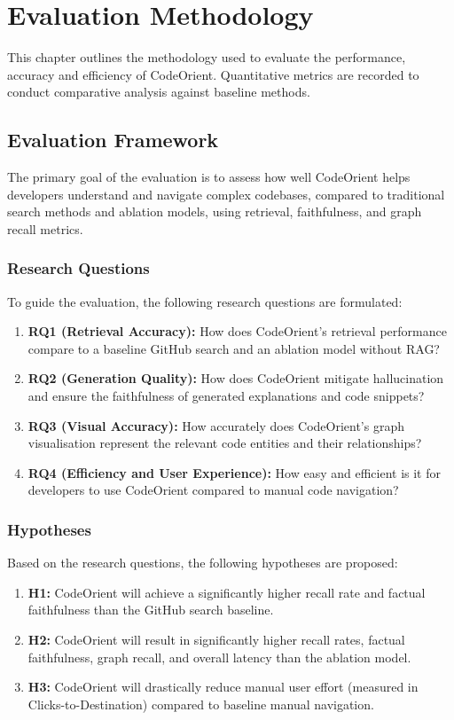 \chapter{Evaluation Methodology}
This chapter outlines the methodology used to evaluate the performance, accuracy and efficiency of CodeOrient. Quantitative metrics are recorded to conduct comparative analysis against baseline methods. 
\section{Evaluation Framework}
The primary goal of the evaluation is to assess how well CodeOrient helps developers understand and navigate complex codebases, compared to traditional search methods and ablation models, using retrieval, faithfulness, and graph recall metrics.
\subsection{Research Questions}
To guide the evaluation, the following research questions are formulated:
\begin{enumerate}
    \item \textbf{RQ1 (Retrieval Accuracy):} How does CodeOrient's retrieval performance compare to a baseline GitHub search and an ablation model without RAG?
    \item \textbf{RQ2 (Generation Quality):} How does CodeOrient mitigate hallucination and ensure the faithfulness of generated explanations and code snippets?
    \item \textbf{RQ3 (Visual Accuracy):} How accurately does CodeOrient's graph visualisation represent the relevant code entities and their relationships?
    \item \textbf{RQ4 (Efficiency and User Experience):} How easy and efficient is it for developers to use CodeOrient compared to manual code navigation?
\end{enumerate}

\subsection{Hypotheses}
Based on the research questions, the following hypotheses are proposed:
\begin{enumerate}
    \item \textbf{H1:} CodeOrient will achieve a significantly higher recall rate and factual faithfulness than the GitHub search baseline.
    \item \textbf{H2:} CodeOrient will result in significantly higher recall rates, factual faithfulness, graph recall, and overall latency than the ablation model.
    \item \textbf{H3:} CodeOrient will drastically reduce manual user effort (measured in Clicks-to-Destination) compared to baseline manual navigation.
\end{enumerate}



